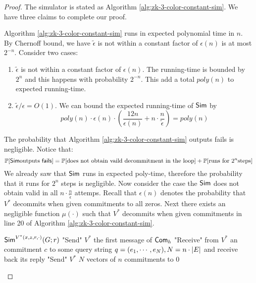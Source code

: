 \begin{proof}
The simulator is stated as Algorithm \ref{alg:zk-3-color-constant-sim}. We have three claims to complete our proof.
\begin{claim} Algorithm \ref{alg:zk-3-color-constant-sim} runs in expected polynomial time in $n$.
By Chernoff bound, we have $\widetilde{\epsilon}$ is not within a constant factor of $\epsilon(n)$ is at most $2^{-n}$.
Consider two cases:
\begin{enumerate}
\item $\widetilde{\epsilon}$ is not within a constant factor of $\epsilon(n)$.
	The running-time is bounded by $2^{n}$ and this happens with probability $2^{-n}$. This add a total $poly(n)$ to expected running-time.
\item $\widetilde{\epsilon}/\epsilon=O(1)$.
We can bound the expected running-time of ${\sf Sim}$ by
$$poly(n)\cdot\epsilon(n)\cdot(\frac{12n}{\epsilon(n)}+n\cdot\frac{n}{\widetilde{\epsilon}})=poly(n)$$
\end{enumerate}
\end{claim}
\begin{claim} The probability that Algorithm \ref{alg:zk-3-color-constant-sim} outputs {\sf fails} is negligible.
Notice that:
$$\mathop{\mathbb P\/}[{\sf Sim} \text{outputs \sf fails}]=\mathop{\mathbb P\/}[\text{does not obtain vaild decommitment in the loop}]+\mathop{\mathbb P\/}[\text{runs for }2^n\text{steps}]$$
We already saw that ${\sf Sim}$ runs in expected poly-time, therefore the probability that it runs for $2^n$ steps is negligible.
Now consider the case the ${\sf Sim}$ does not obtain valid in all $n\cdot\frac{n}{\widetilde{\epsilon}}$ attemps. Recall that $\epsilon(n)$ denotes the probability that $V^*$ decommits when given commitments to all zeros. Next there exists an negligible function $\mu(\cdot)$ such that $V^*$ decommits when given commitments in line 20 of Algorithm \ref{alg:zk-3-color-constant-sim}.
\end{claim}

\begin{algorithm}
${\sf Sim}^{V^*(x,z,r,\cdot)}(G;r)$\;
"Send" $V^*$ the first message of ${\sf Com}_h$\;
"Receive" from $V^*$ an commitment $c$ to some query string $q=(e_1,\cdots,e_N),N=n\cdot\left|E\right|$ and receive back its reply\;
"Send" $V^*$ $N$ vectors of $n$ commitments to $0$\;
\Else{
    
}
\end{algorithm}
\end{proof}
